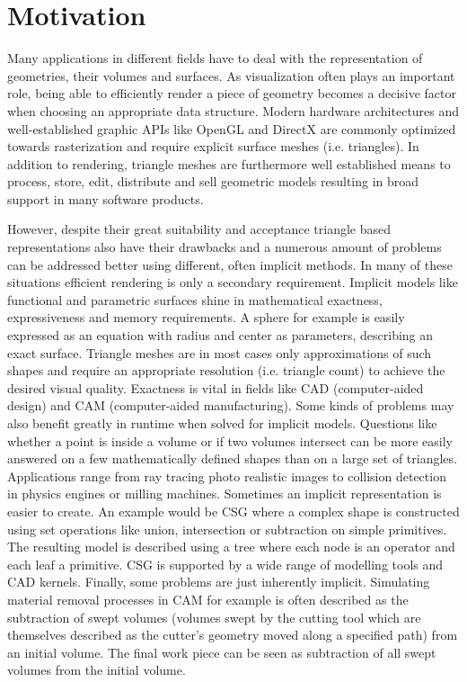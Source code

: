 
 
\section{Motivation}

Many applications in different fields have to deal with the representation of geometries, their volumes and surfaces. As visualization often plays an important role, being able to efficiently render a piece of geometry becomes a decisive factor when choosing an appropriate data structure. Modern hardware architectures and well-established graphic APIs like OpenGL and DirectX are commonly optimized towards rasterization and require explicit surface meshes (i.e. triangles). In addition to rendering, triangle meshes are furthermore well established means to process, store, edit, distribute and sell geometric models resulting in broad support in many software products.

However, despite their great suitability and acceptance triangle based representations also have their drawbacks and a numerous amount of problems can be addressed better using different, often implicit methods. In many of these situations efficient rendering is only a secondary requirement. Implicit models like functional and parametric surfaces shine in mathematical exactness, expressiveness and memory requirements. A sphere for example is easily expressed as an equation with radius and center as parameters, describing an exact surface. Triangle meshes are in most cases only approximations of such shapes and require an appropriate resolution (i.e. triangle count) to achieve the desired visual quality. Exactness is vital in fields like CAD (computer-aided design) and CAM (computer-aided manufacturing).
Some kinds of problems may also benefit greatly in runtime when solved for implicit models. Questions like whether a point is inside a volume or if two volumes intersect can be more easily answered on a few mathematically defined shapes than on a large set of triangles. Applications range from ray tracing photo realistic images to collision detection in physics engines or milling machines. 
Sometimes an implicit representation is easier to create. An example would be CSG where a complex shape is constructed using set operations like union, intersection or subtraction on simple primitives. The resulting model is described using a tree where each node is an operator and each leaf a primitive. CSG is supported by a wide range of modelling tools and CAD kernels.
Finally, some problems are just inherently implicit. Simulating material removal processes in CAM for example is often described as the subtraction of swept volumes (volumes swept by the cutting tool which are themselves described as the cutter's geometry moved along a specified path) from an initial volume. The final work piece can be seen as subtraction of all swept volumes from the initial volume.

